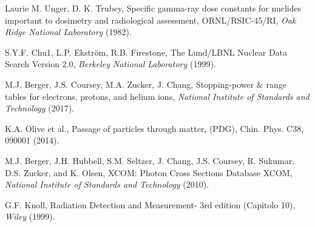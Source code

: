 \begin{thebibliography}{99} %

Laurie M. Unger, D. K. Trubey, Specific gamma-ray dose constants for nuclides important to dosimetry and radiological assessment, ORNL/RSIC-45/RI, \emph{Oak Ridge National Laboratory} (1982).

S.Y.F. Chu1, L.P. Ekström, R.B. Firestone, The Lund/LBNL Nuclear Data Search Version 2.0, \emph{Berkeley National Laboratory} (1999).

M.J. Berger, J.S. Coursey, M.A. Zucker, J. Chang, Stopping-power \& range tables for electrons, protons, and helium ions, \emph{National Institute of Standards and Technology} (2017).

K.A. Olive et al., Passage of particles through matter, (PDG), Chin. Phys. C38, 090001 (2014).

M.J. Berger, J.H. Hubbell, S.M. Seltzer, J. Chang, J.S. Coursey, R. Sukumar, D.S. Zucker, and K. Olsen, XCOM: Photon Cross Sections Database XCOM, \emph{National Institute of Standards and Technology} (2010).

G.F. Knoll, Radiation Detection and Measurement- 3rd edition (Capitolo 10), \emph{Wiley} (1999).

\end{thebibliography}
